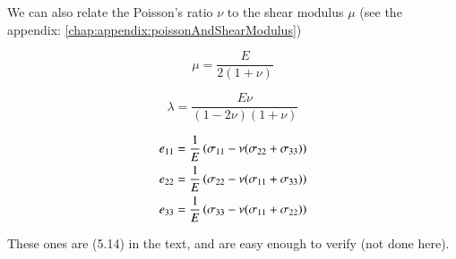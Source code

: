 We can also relate the Poisson's ratio $\nu$ to the shear modulus $\mu$ (see the appendix: \ref{chap:appendix:poissonAndShearModulus})

\begin{equation}\label{eqn:continuumL5:430}
\mu = \frac{E}{2(1 + \nu)}
\end{equation}

\begin{equation}\label{eqn:continuumL5:450}
\lambda = \frac{E \nu}{(1 - 2 \nu)(1 + \nu)}
\end{equation}

\begin{align}\label{eqn:continuumL5:470}
e_{11} &= \frac{1}{E}\left( \sigma_{11} - \nu(\sigma_{22} + \sigma_{33}) \right) \\
e_{22} &= \frac{1}{E}\left( \sigma_{22} - \nu(\sigma_{11} + \sigma_{33}) \right) \\
e_{33} &= \frac{1}{E}\left( \sigma_{33} - \nu(\sigma_{11} + \sigma_{22}) \right)
\end{align}

These ones are (5.14) in the text, and are easy enough to verify (not done here).
